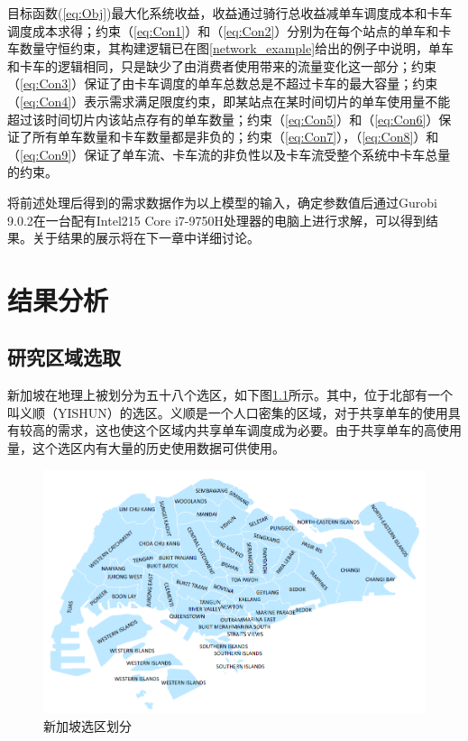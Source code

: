 \documentclass[]{tongjithesis}
\numberwithin{equation}{chapter}
\begin{document}
目标函数(\ref{eq:Obj})最大化系统收益，收益通过骑行总收益减单车调度成本和卡车调度成本求得；约束（\ref{eq:Con1}）和（\ref{eq:Con2}）分别为在每个站点的单车和卡车数量守恒约束，其构建逻辑已在图\ref{network_example}给出的例子中说明，单车和卡车的逻辑相同，只是缺少了由消费者使用带来的流量变化这一部分；约束（\ref{eq:Con3}）保证了由卡车调度的单车总数总是不超过卡车的最大容量；约束（\ref{eq:Con4}）表示需求满足限度约束，即某站点在某时间切片的单车使用量不能超过该时间切片内该站点存有的单车数量；约束（\ref{eq:Con5}）和（\ref{eq:Con6}）保证了所有单车数量和卡车数量都是非负的；约束（\ref{eq:Con7}），（\ref{eq:Con8}）和（\ref{eq:Con9}）保证了单车流、卡车流的非负性以及卡车流受整个系统中卡车总量的约束。

将前述处理后得到的需求数据作为以上模型的输入，确定参数值后通过Gurobi 9.0.2\cite{gurobi2018gurobi}在一台配有Intel215 Core i7-9750H处理器的电脑上进行求解，可以得到结果。关于结果的展示将在下一章中详细讨论。


\clearpage

\chapter{结果分析}
\section{研究区域选取}
新加坡在地理上被划分为五十八个选区，如下图\ref{regions}所示。其中，位于北部有一个叫义顺（YISHUN）的选区。义顺是一个人口密集的区域，对于共享单车的使用具有较高的需求，这也使这个区域内共享单车调度成为必要。由于共享单车的高使用量，这个选区内有大量的历史使用数据可供使用。
\begin{figure}[H]
	\centering
	\includegraphics[width= 0.9 \textwidth]{figures_main/regions.png}
	\caption{新加坡选区划分}
	\label{regions}
\end{figure}
\end{document}
